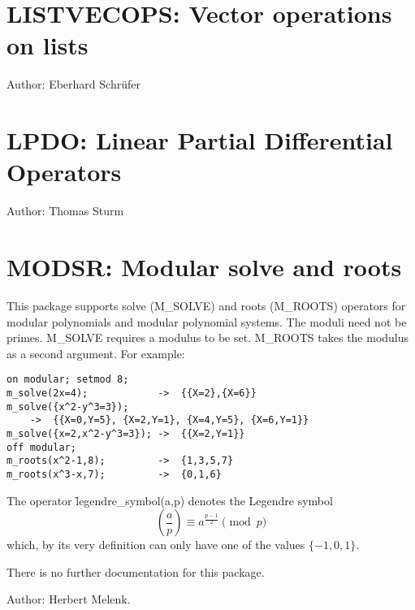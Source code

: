 
\newpage

\section{LISTVECOPS: Vector operations on lists}
\label{LISTVECOPS}

Author: Eberhard Schr\"{u}fer


\newpage

\section{LPDO: Linear Partial Differential Operators}
\label{LPDO}

Author: Thomas Sturm


\newpage

\section{MODSR: Modular solve and roots} 

This package supports solve (M\_SOLVE) and roots (M\_ROOTS) operators for
modular polynomials and modular polynomial systems.  The moduli need not
be primes. M\_SOLVE requires a modulus to be set.  M\_ROOTS takes the
modulus as a second argument. For example:

\begin{verbatim}
on modular; setmod 8;
m_solve(2x=4);            ->  {{X=2},{X=6}}
m_solve({x^2-y^3=3});
    ->  {{X=0,Y=5}, {X=2,Y=1}, {X=4,Y=5}, {X=6,Y=1}}
m_solve({x=2,x^2-y^3=3}); ->  {{X=2,Y=1}}
off modular;
m_roots(x^2-1,8);         ->  {1,3,5,7}
m_roots(x^3-x,7);         ->  {0,1,6}
\end{verbatim}

The operator \f{legendre\_symbol}(a,p) denotes the Legendre symbol
\begin{displaymath}
  \left(\frac{a}{p}\right) \equiv a^{\frac{p-1}{2}} \pmod{p}
\end{displaymath}
which, by its very definition can only have one of the values $\{-1,0,1\}$.

There is no further documentation for this package.

Author: Herbert Melenk.

